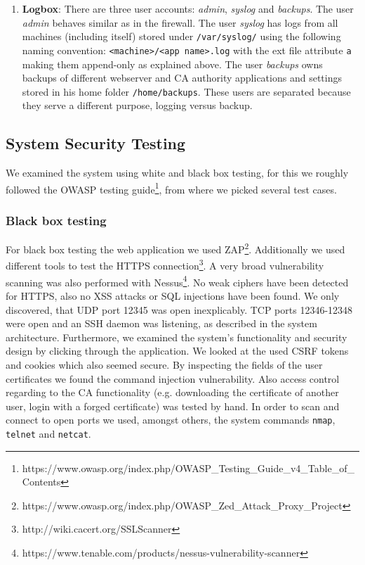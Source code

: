 \documentclass[english]{article}
\newcommand{\code}[1]{\texttt{#1}}
\begin{document}
\begin{enumerate}
\begin{enumerate}[label=(\alph*)]
\item \textbf{Logbox}: There are three user accounts: \textit{admin}, \textit{syslog} and \textit{backups}. The user \textit{admin} behaves similar as in the firewall. The user \textit{syslog} has logs from all machines (including itself) stored under \texttt{/var/syslog/} using the following naming convention: \texttt{<machine>/<app name>.log} with the ext file attribute \texttt{a} making them append-only as explained above. The user \textit{backups} owns backups of different webserver and CA authority applications and settings stored in his home folder \texttt{/home/backups}. These users are separated because they serve a different purpose, logging versus backup.
\end{enumerate}
\end{enumerate}

\subsection{System Security Testing} %

We examined the system using white and black box testing, for this we roughly followed the OWASP testing guide\footnote{https://www.owasp.org/index.php/OWASP\_Testing\_Guide\_v4\_Table\_of\_Contents}, from where we picked several test cases.

\subsubsection{Black box testing}
For black box testing the web application we used ZAP\footnote{https://www.owasp.org/index.php/OWASP\_Zed\_Attack\_Proxy\_Project}. Additionally we used different tools to test the HTTPS connection\footnote{http://wiki.cacert.org/SSLScanner}. A very broad vulnerability scanning was also performed with Nessus\footnote{https://www.tenable.com/products/nessus-vulnerability-scanner}. No weak ciphers have been detected for HTTPS, also no XSS attacks or SQL injections have been found. We only discovered, that UDP port 12345 was open inexplicably. TCP ports 12346-12348 were open and an SSH daemon was listening, as described in the system architecture. Furthermore, we examined the system's functionality and security design by clicking through the application. We looked at the used CSRF tokens and cookies which also seemed secure. By inspecting the fields of the user certificates we found the command injection vulnerability. Also access control regarding to the CA functionality (e.g. downloading the certificate of another user, login with a forged certificate) was tested by hand. In order to scan and connect to open ports we used, amongst others, the system commands \code{nmap}, \code{telnet} and \code{netcat}.
\end{document}
